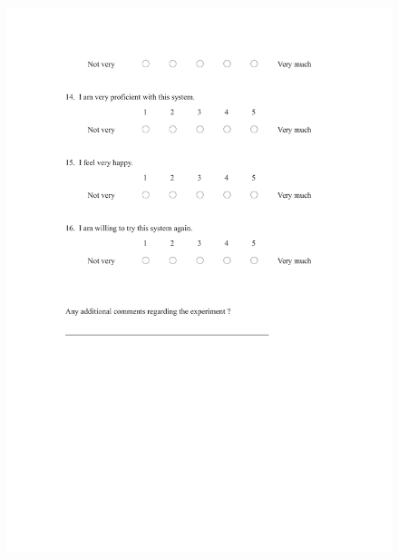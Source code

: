 \begin{figure}[h]
\centering
\includegraphics[width=1\textwidth,height=0.7\textheight]{A_thesis/appendix/Experiment 2 3_questionnaire-3.png}
\end{figure}
\newpage

